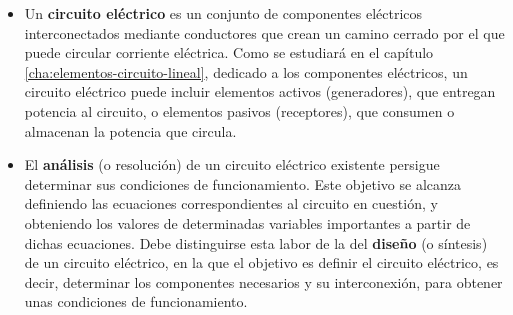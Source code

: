 \begin{itemize}
  
\item Un \textbf{circuito eléctrico} es un conjunto de componentes eléctricos interconectados mediante conductores que crean un camino cerrado por el que puede circular corriente eléctrica. Como se estudiará en el capítulo \ref{cha:elementos-circuito-lineal}, dedicado a los componentes eléctricos, un circuito eléctrico puede incluir elementos activos (generadores), que entregan potencia al circuito, o elementos pasivos (receptores), que consumen o almacenan la potencia que circula.
  
\item El \textbf{análisis} (o resolución) de un circuito eléctrico existente persigue determinar sus condiciones de funcionamiento. Este objetivo se alcanza definiendo las ecuaciones correspondientes al circuito en cuestión, y obteniendo los valores de determinadas variables importantes a partir de dichas ecuaciones. Debe distinguirse esta labor de la del \textbf{diseño} (o síntesis) de un circuito eléctrico, en la que el objetivo es definir el circuito eléctrico, es decir, determinar los componentes necesarios y su interconexión, para obtener unas condiciones de funcionamiento. 


\end{itemize}
